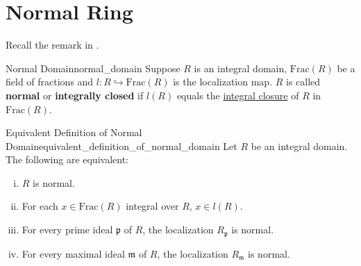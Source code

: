 \section{Normal Ring}

Recall the remark in .
\begin{definition}{Normal Domain}{normal_domain}
    Suppose $R$ is an integral domain, $\mathrm{Frac}(R)$ be a field of fractions and $l:R\hookrightarrow \mathrm{Frac}(R)$ is the localization map. $R$ is called \textbf{normal} or \textbf{integrally closed} if $l(R)$ equals the \hyperref[th:integral_closure]{integral closure} of $R$ in $\mathrm{Frac}(R)$.
\end{definition}

\begin{proposition}{Equivalent Definition of Normal Domain}{equivalent_definition_of_normal_domain}
    Let $R$ be an integral domain. The following are equivalent:
    \begin{enumerate}[(i)]
        \item $R$ is normal.
        \item For each $x\in \mathrm{Frac}(R)$ integral over $R$, $x\in l(R)$.
        \item For every prime ideal $\mathfrak{p}$ of $R$, the localization $R_\mathfrak{p}$ is normal.
        \item For every maximal ideal $\mathfrak{m}$ of $R$, the localization $R_\mathfrak{m}$ is normal.
    \end{enumerate}
\end{proposition}


